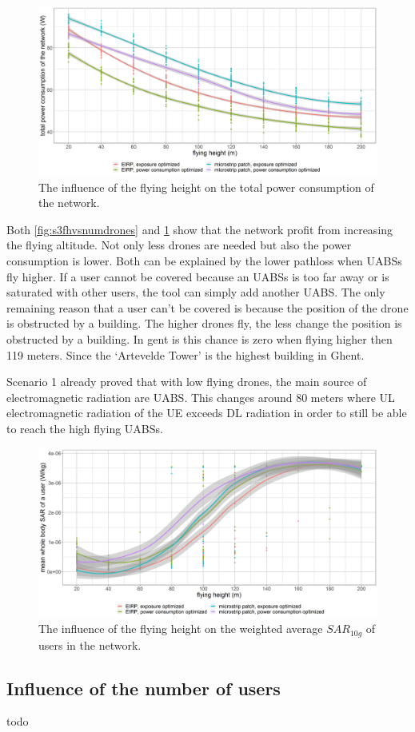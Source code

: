 \begin{figure}[h!]
  \includegraphics[width=\textwidth]{../results/s3/fhvspc.png}
  \caption{The influence of the flying height on the total power consumption of the network.}
  \label{fig:s3fhvspc}
\end{figure}

Both \ref{fig:s3fhvsnumdrones} and \ref{fig:s3fhvspc} show that the network profit from increasing the flying altitude. 
Not only less drones are needed but also the power consumption is lower. Both can be explained by the lower pathloss when \gls{UABS}s fly higher.
If a user cannot be covered because an \gls{UABS}s is too far away or is saturated with other users, 
the tool can simply add another \gls{UABS}. The only remaining reason that a user can’t be covered is because the position of 
the drone is obstructed by a building. The higher drones fly, the less change the position is obstructed by a building. 
In gent is this chance is zero when flying higher then 119 meters. Since the `Artevelde Tower' is the highest building in Ghent.

Scenario 1 already proved that with low flying drones, the main source of electromagnetic radiation are \gls{UABS}. 
This changes around 80 meters where \gls{UL} electromagnetic radiation of the \gls{UE}
 exceeds \gls{DL} radiation in order to still be able to reach the high flying \gls{UABS}s.

\begin{figure}[]
  \includegraphics[width=\textwidth]{../results/s3/fhvssar.png}
  \caption{The influence of the flying height on the weighted average $SAR_{10g}$ of users in the network.}
  \label{fig:s3fhvssar}
\end{figure}

\subsection{Influence of the number of users}
todo